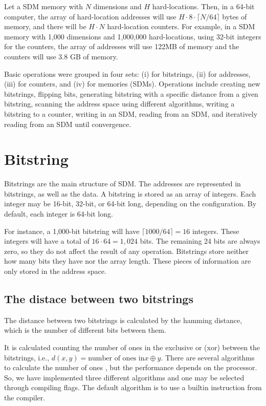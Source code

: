 Let a SDM memory with $N$ dimensions and $H$ hard-locations. Then, in a 64-bit computer, the array of hard-location addresses will use $H \cdot 8 \cdot \lceil N/64 \rceil$ bytes of memory, and there will be $H \cdot N$ hard-location counters. For example, in a SDM memory with 1,000 dimensions and 1,000,000 hard-locations, using 32-bit integers for the counters, the array of addresses will use 122MB of memory and the counters will use 3.8 GB of memory.

Basic operations were grouped in four sets: (i) for bitstrings, (ii) for addresses, (iii) for counters, and (iv) for memories (SDMs). Operations include creating new bitstrings, flipping bits, generating bitstring with a specific distance from a given bitstring, scanning the address space using different algorithms, writing a bitstring to a counter, writing in an SDM, reading from an SDM, and iteratively reading from an SDM until convergence.


\section{Bitstring}

Bitstrings are the main structure of SDM. The addresses are represented in bitstrings, as well as the data. A bitstring is stored as an array of integers. Each integer may be 16-bit, 32-bit, or 64-bit long, depending on the configuration. By default, each integer is 64-bit long.

For instance, a 1,000-bit bitstring will have $\lceil 1000/64 \rceil = 16$ integers. These integers will have a total of $16 \cdot 64 = 1,024$ bits. The remaining 24 bits are always zero, so they do not affect the result of any operation. Bitstrings store neither how many bits they have nor the array length. These pieces of information are only stored in the address space.


\subsection{The distace between two bitstrings}

The distance between two bitstrings is calculated by the hamming distance, which is the number of different bits between them.

It is calculated counting the number of ones in the exclusive or (xor) between the bitstrings, i.e., $d(x, y) = \text{number of ones in} x \oplus y$. There are several algorithms to calculate the number of ones \citep{warren2013hacker}, but the performance depends on the processor. So, we have implemented three different algorithms and one may be selected through compiling flags. The default algorithm is to use a builtin instruction from the compiler.

